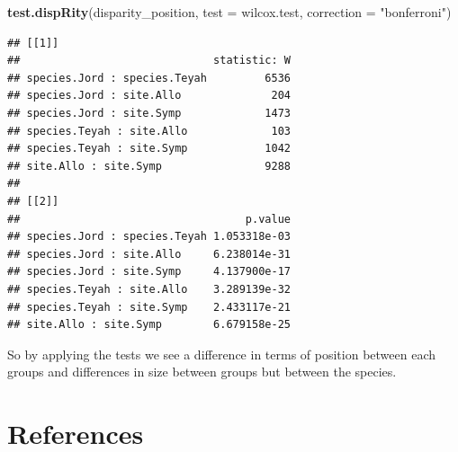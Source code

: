 \documentclass[
]{book}
\newenvironment{Shaded}{\begin{snugshade}}{\end{snugshade}}
\newcommand{\DataTypeTok}[1]{\textcolor[rgb]{0.13,0.29,0.53}{#1}}
\newcommand{\KeywordTok}[1]{\textcolor[rgb]{0.13,0.29,0.53}{\textbf{#1}}}
\newcommand{\NormalTok}[1]{#1}
\newcommand{\StringTok}[1]{\textcolor[rgb]{0.31,0.60,0.02}{#1}}
\begin{document}
\begin{Shaded}
\begin{Highlighting}[]
\KeywordTok{test.dispRity}\NormalTok{(disparity\_position, }\DataTypeTok{test =}\NormalTok{ wilcox.test, }\DataTypeTok{correction =} \StringTok{"bonferroni"}\NormalTok{)}
\end{Highlighting}
\end{Shaded}

\begin{verbatim}
## [[1]]
##                              statistic: W
## species.Jord : species.Teyah         6536
## species.Jord : site.Allo              204
## species.Jord : site.Symp             1473
## species.Teyah : site.Allo             103
## species.Teyah : site.Symp            1042
## site.Allo : site.Symp                9288
## 
## [[2]]
##                                   p.value
## species.Jord : species.Teyah 1.053318e-03
## species.Jord : site.Allo     6.238014e-31
## species.Jord : site.Symp     4.137900e-17
## species.Teyah : site.Allo    3.289139e-32
## species.Teyah : site.Symp    2.433117e-21
## site.Allo : site.Symp        6.679158e-25
\end{verbatim}

So by applying the tests we see a difference in terms of position between each groups and differences in size between groups but between the species.

\hypertarget{references}{%
\chapter{References}\label{references}}

  
\end{document}
